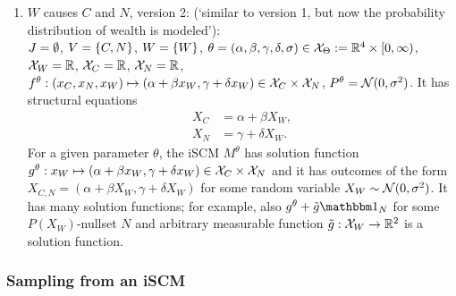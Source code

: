 \begin{Eg}
\begin{enumerate}
\begin{align*}
        X_C^{\doit(x_W)} & = \alpha + \beta x_W, \\
        X_N^{\doit(x_W)} & = \gamma + \delta x_W.
      \end{align*}
      For a given parameter $\theta$, the iSCM $M^{\theta}$ has 
      unique solution function $g^\theta : x_W \mapsto (\alpha + \beta x_W, \gamma + \delta x_W) \in \C{X}_C \times \C{X}_N$
      and it has unique potential outcomes of the form $X_{C,N}^{\doit(x_W)} = (\alpha + \beta x_W, \gamma + \delta x_W)$.
    \item $W$ causes $C$ and $N$, version 2: (`similar to version 1, but now the probability distribution of wealth is modeled'):\\
      $J = \emptyset$, $V = \{C,N\}$, $W = \{W\}$, $\theta = (\alpha,\beta,\gamma,\delta,\sigma) \in \mathcal{X}_\Theta := \mathbb{R}^4 \times [0,\infty)$, 
      $\mathcal{X}_W = \mathbb{R}$, $\mathcal{X}_C = \mathbb{R}$, $\mathcal{X}_N = \mathbb{R}$, $f^{\theta} : (x_C,x_N,x_W) \mapsto (\alpha + \beta x_W, \gamma + \delta x_W) \in \mathcal{X}_C \times \mathcal{X}_N$, $P^{\theta} = \mathcal{N}(0,\sigma^2)$.
      It has structural  equations
      \begin{align*}
        X_C & = \alpha + \beta X_W, \\
        X_N & = \gamma + \delta X_W.
      \end{align*}
      For a given parameter $\theta$, the iSCM $M^{\theta}$ has solution function $g^\theta : x_W \mapsto (\alpha + \beta x_W, \gamma + \delta x_W) \in \C{X}_C \times \C{X}_N$ and
      it has outcomes of the form $X_{C,N} = (\alpha + \beta X_W, \gamma + \delta X_W)$ for some random variable $X_W \sim \mathcal{N}(0,\sigma^2)$.
      It has many solution functions; for example, also $g^\theta + \tilde{g} \I_N$ for some $P(X_W)$-nullset $N$ and arbitrary measurable function $\tilde{g} : \mathcal{X}_W \to \mathbb{R}^2$ is a solution function.
  \end{enumerate}
\end{Eg}

\subsubsection{Sampling from an iSCM}\label{sec:scm_sampling}


